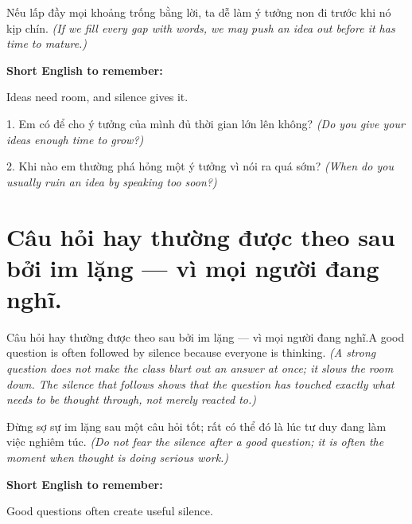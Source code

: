 \begin{baihoc}
Nếu lấp đầy mọi khoảng trống bằng lời, ta dễ làm ý tưởng non đi trước khi nó kịp chín.
\textit{(If we fill every gap with words, we may push an idea out before it has time to mature.)}
\end{baihoc}

\begin{ghinhoanh}
\textbf{Short English to remember:}

Ideas need room, and silence gives it.

\end{ghinhoanh}

\begin{tuhocnhanh}
1. Em có để cho ý tưởng của mình đủ thời gian lớn lên không? \textit{(Do you give your ideas enough time to grow?)}

2. Khi nào em thường phá hỏng một ý tưởng vì nói ra quá sớm? \textit{(When do you usually ruin an idea by speaking too soon?)}
\end{tuhocnhanh}
\ngancach


\section{Câu hỏi hay thường được theo sau bởi im lặng — vì mọi người đang nghĩ.}
\begin{truyen}{Câu hỏi hay thường được theo sau bởi im lặng — vì mọi người đang nghĩ.}{A good question is often followed by silence because everyone is thinking.}
\textit{(A strong question does not make the class blurt out an answer at once; it slows the room down. The silence that follows shows that the question has touched exactly what needs to be thought through, not merely reacted to.)}
\end{truyen}

\begin{baihoc}
Đừng sợ sự im lặng sau một câu hỏi tốt; rất có thể đó là lúc tư duy đang làm việc nghiêm túc.
\textit{(Do not fear the silence after a good question; it is often the moment when thought is doing serious work.)}
\end{baihoc}

\begin{ghinhoanh}
\textbf{Short English to remember:}

Good questions often create useful silence.

\end{ghinhoanh}

